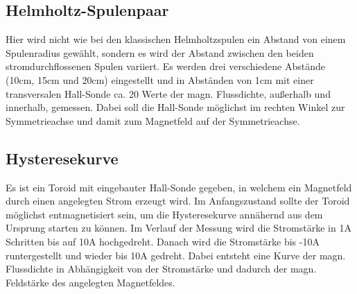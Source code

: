 \documentclass[titlepage = firstcover]{scrartcl}
\begin{document}
      \subsection{Helmholtz-Spulenpaar}
        Hier wird nicht wie bei den klassischen Helmholtzspulen ein Abstand von einem Spulenradius gewählt, sondern es wird der Abstand zwischen den beiden
        stromdurchflossenen Spulen variiert. Es werden drei verschiedene Abstände (10cm, 15cm und 20cm) eingestellt und in Abständen von 1cm mit einer transversalen Hall-Sonde
        ca. 20 Werte der magn. Flussdichte, außerhalb und innerhalb, gemessen. Dabei soll die Hall-Sonde möglichst im rechten Winkel zur Symmetrieachse und
        damit zum Magnetfeld auf der Symmetrieachse.
      \subsection{Hysteresekurve}
        Es ist ein Toroid mit eingebauter Hall-Sonde gegeben, in welchem ein Magnetfeld durch einen angelegten Strom erzeugt wird. Im Anfangszustand sollte
        der Toroid möglichst entmagnetisiert sein, um die Hysteresekurve annähernd aus dem Ursprung starten zu können. Im Verlauf der Messung wird die
        Stromstärke in 1A Schritten bis auf 10A hochgedreht. Danach wird die Stromstärke bis -10A runtergestellt und wieder bis 10A gedreht.
        Dabei entsteht eine Kurve der magn. Flussdichte in Abhängigkeit von der Stromstärke und dadurch der magn. Feldstärke des angelegten Magnetfeldes.
\end{document}
